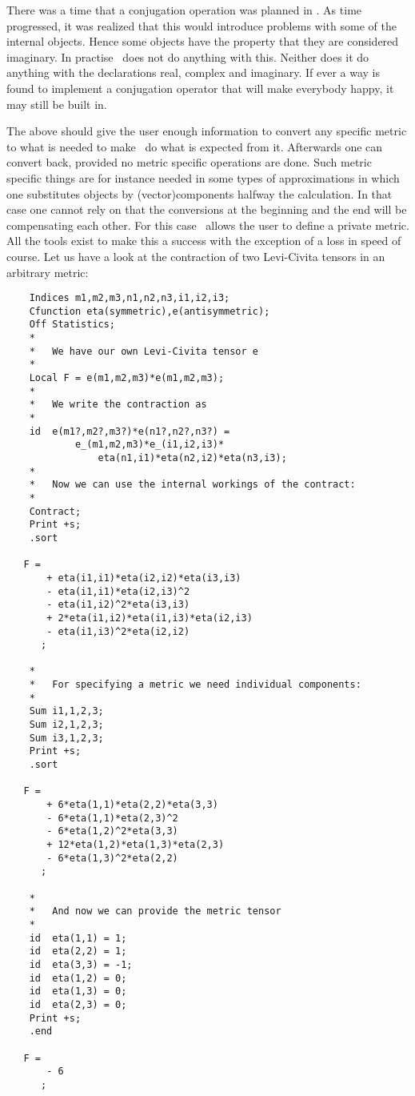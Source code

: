 \noindent There was a time that a conjugation operation 
was planned in \FORM\@. As time progressed, it was realized that this would 
introduce problems with some of the internal objects. Hence some objects 
have the property that they are considered imaginary. In 
practise \FORM\ does not do anything with this. Neither does it do anything 
with the declarations real, complex and 
imaginary. If ever a way is found to implement a conjugation 
operator that will make everybody happy, it may still be built in. \hfill 
\vspace{2mm}

\noindent The above should give the user enough information to convert any 
specific metric to what is needed to make \FORM\ do what is expected from it. 
Afterwards one can convert back, provided no metric specific 
operations are done. Such metric specific things are for instance needed in 
some types of approximations in which one substitutes objects by 
(vector)components halfway the calculation. In that case one cannot rely on 
that the conversions at the beginning and the end will be compensating each 
other. For this case \FORM\ allows the user to define a private metric. All 
the tools exist to make this a success with the exception of a loss in 
speed of course. Let us have a look at the contraction of two Levi-Civita 
tensors in an arbitrary metric:
\begin{verbatim}
    Indices m1,m2,m3,n1,n2,n3,i1,i2,i3;
    Cfunction eta(symmetric),e(antisymmetric);
    Off Statistics;
    *
    *   We have our own Levi-Civita tensor e
    *
    Local F = e(m1,m2,m3)*e(m1,m2,m3);
    *
    *   We write the contraction as
    *
    id  e(m1?,m2?,m3?)*e(n1?,n2?,n3?) =
            e_(m1,m2,m3)*e_(i1,i2,i3)*
                eta(n1,i1)*eta(n2,i2)*eta(n3,i3);
    *
    *   Now we can use the internal workings of the contract:
    *
    Contract;
    Print +s;
    .sort

   F =
       + eta(i1,i1)*eta(i2,i2)*eta(i3,i3)
       - eta(i1,i1)*eta(i2,i3)^2
       - eta(i1,i2)^2*eta(i3,i3)
       + 2*eta(i1,i2)*eta(i1,i3)*eta(i2,i3)
       - eta(i1,i3)^2*eta(i2,i2)
      ;

    *
    *   For specifying a metric we need individual components:
    *
    Sum i1,1,2,3;
    Sum i2,1,2,3;
    Sum i3,1,2,3;
    Print +s;
    .sort

   F =
       + 6*eta(1,1)*eta(2,2)*eta(3,3)
       - 6*eta(1,1)*eta(2,3)^2
       - 6*eta(1,2)^2*eta(3,3)
       + 12*eta(1,2)*eta(1,3)*eta(2,3)
       - 6*eta(1,3)^2*eta(2,2)
      ;

    *
    *   And now we can provide the metric tensor
    *
    id  eta(1,1) = 1;
    id  eta(2,2) = 1;
    id  eta(3,3) = -1;
    id  eta(1,2) = 0;
    id  eta(1,3) = 0;
    id  eta(2,3) = 0;
    Print +s;
    .end

   F =
       - 6
      ;
\end{verbatim}
